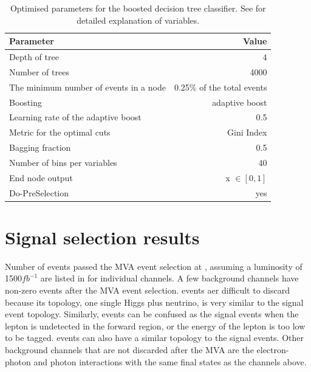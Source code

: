 \begin{table}[!tbp]\centering

\begin{tabular}{lr}
\hline \hline
 Parameter &  Value \\
\hline
Depth of tree & 4 \\
Number of trees & 4000 \\
The minimum number of events in a node &  0.25\% of the total events \\
Boosting & adaptive boost \\
Learning rate of the adaptive boost & 0.5 \\
Metric for the optimal cuts & Gini Index \\
Bagging fraction & 0.5 \\
Number of bins per variables & 40 \\
End node output & x $\in [0,1]$ \\
Do-PreSelection & yes \\
\hline \hline
\end{tabular}

\caption
{Optimised parameters for the boosted decision tree classifier. See  for detailed explanation of variables.}
\label{tab:doubleHiggsBDTparameters}
\end{table}

\section{Signal selection results}
\label{sec:doubleHiggsSignalSelResult}

Number of events passed the MVA event selection at , assuming a luminosity of 1500$fb^{-1}$  are listed in  for individual channels. A few  background channels have non-zero events after the MVA event selection. \eeTo{\Pquark \APquark \PHiggs \Pnu \APnu} events aer difficult to discard because its topology, one single Higgs plus neutrino, is very similar to the signal event topology. Similarly, \eeTo{ \Pquark \Pquark \Pquark \Pquark \Plepton \Pnu} events can be confused as the signal events when the lepton is undetected in the forward region, or the energy of the lepton is too low to be tagged. \eeTo{ \Pquark \Pquark \Pquark \Pquark \Pnu \APnu} events can also have a similar topology to the signal events. Other background channels that are not discarded after the MVA are the electron-photon and photon interactions with the same final states as the channels above.


